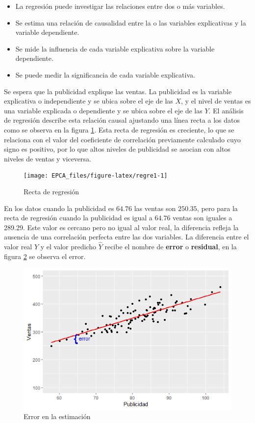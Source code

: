 \documentclass[letterpaper,]{book}
\providecommand{\tightlist}{%
  \setlength{\itemsep}{0pt}\setlength{\parskip}{0pt}}
\begin{document}
\begin{itemize}
\tightlist
\item
  La regresión puede investigar las relaciones entre dos o más variables.
\item
  Se estima una relación de causalidad entre la o las variables explicativas y la variable dependiente.
\item
  Se mide la influencia de cada variable explicativa sobre la variable dependiente.
\item
  Se puede medir la significancia de cada variable explicativa.
\end{itemize}

Se espera que la publicidad explique las ventas. La publicidad es la variable explicativa o independiente y se ubica sobre el eje de las \(X\), y el nivel de ventas es una variable explicada o dependiente y se ubica sobre el eje de las \(Y\). El análisis de regresión describe esta relación causal ajustando una línea recta a los datos como se observa en la figura \ref{fig:regre1}. Esta recta de regresión es creciente, lo que se relaciona con el valor del coeficiente de correlación previamente calculado cuyo signo es positivo, por lo que altos niveles de publicidad se asocian con altos niveles de ventas y viceversa.

\begin{figure}[!h]

{\centering \texttt{[image: EPCA\_files/figure-latex/regre1-1]} 

}

\caption{Recta de regresión}\label{fig:regre1}
\end{figure}

En los datos cuando la publicidad es \(64.76\) las ventas son \(250.35\), pero para la recta de regresión cuando la publicidad es igual a \(64.76\) ventas son iguales a 289.29. Este valor es cercano pero no igual al valor real, la diferencia refleja la ausencia de una correlación perfecta entre las dos variables. La diferencia entre el valor real \(Y\) y el valor predicho \(\hat{Y}\) recibe el nombre de \textbf{error} o \textbf{residual}, en la figura \ref{fig:error1} se observa el error.

\begin{figure}[!h]

{\centering \includegraphics[width=0.6\linewidth]{error} 

}

\caption{Error en la estimación}\label{fig:error1}
\end{figure}
\end{document}
